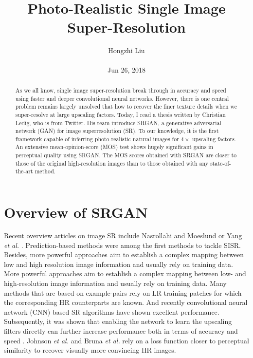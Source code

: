 \documentclass[10pt,twocolumn,letterpaper]{article}
\title{Photo-Realistic Single Image Super-Resolution}
\author{Hongzhi Liu\\\\
Jun 26, 2018}
\begin{document}
\maketitle
\begin{abstract}
	As we all know, single image super-resolution break through in accuracy and speed using faster and deeper convolutional neural networks. However, there is one central problem remains largely unsolved that how to recover the finer texture details when we super-resolve at large upscaling factors. Today, I read a thesis written by Christian Ledig, who is from Twitter. His team introduce SRGAN, a generative adversarial network (GAN) for image superresolution (SR). To our knowledge, it is the first framework capable of inferring photo-realistic natural images for $4\times$ upscaling factors. An extensive mean-opinion-score (MOS) test shows hugely significant gains in perceptual quality using SRGAN. The MOS scores obtained with SRGAN are closer to those of the original high-resolution images than to those obtained with any state-of-the-art method.
\end{abstract}
\section{Overview of SRGAN}

Recent overview articles on image SR include Nasrollahi and Moeslund \cite{Nasrollahi2014Super} or Yang \emph{et al.} \cite{Yang2014Single}. Prediction-based methods were among the first methods to tackle SISR. Besides, more powerful approaches aim to establish a complex mapping between low and high resolution image information and usually rely on training data. More powerful approaches aim to establish a complex mapping between low- and high-resolution image information and usually rely on training data. Many methods that are based on example-pairs rely on LR training patches for which the corresponding HR counterparts are known. And recently convolutional neural network (CNN) based SR algorithms have shown excellent performance. Subsequently, it was shown that enabling the network to learn the upscaling filters directly can further increase performance both in terms of accuracy and speed \cite{Dong2016Accelerating}. Johnson \emph{et al.} \cite{Johnson2016Perceptual} and Bruna \emph{et al.} \cite{Bruna2015Super} rely on a loss function closer to perceptual similarity to recover visually more convincing HR images.
\end{document}

